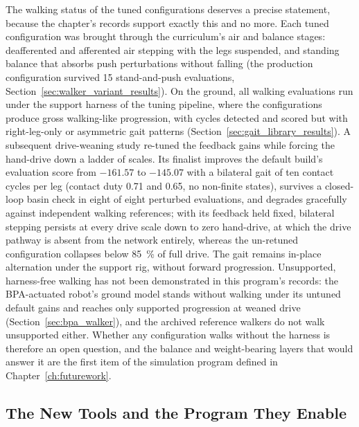 The walking status of the tuned configurations deserves a precise statement, because the chapter's records support exactly this and no more. Each tuned configuration was brought through the curriculum's air and balance stages: deafferented and afferented air stepping with the legs suspended, and standing balance that absorbs push perturbations without falling (the production configuration survived 15 stand-and-push evaluations, Section~\ref{sec:walker_variant_results}). On the ground, all walking evaluations run under the support harness of the tuning pipeline, where the configurations produce gross walking-like progression, with cycles detected and scored but with right-leg-only or asymmetric gait patterns (Section~\ref{sec:gait_library_results}). A subsequent drive-weaning study re-tuned the feedback gains while forcing the hand-drive down a ladder of scales. Its finalist improves the default build's evaluation score from $-161.57$ to $-145.07$ with a bilateral gait of ten contact cycles per leg (contact duty 0.71 and 0.65, no non-finite states), survives a closed-loop basin check in eight of eight perturbed evaluations, and degrades gracefully against independent walking references; with its feedback held fixed, bilateral stepping persists at every drive scale down to zero hand-drive, at which the drive pathway is absent from the network entirely, whereas the un-retuned configuration collapses below \qty{85}{\percent} of full drive. The gait remains in-place alternation under the support rig, without forward progression. Unsupported, harness-free walking has not been demonstrated in this program's records: the BPA-actuated robot's ground model stands without walking under its untuned default gains and reaches only supported progression at weaned drive (Section~\ref{sec:bpa_walker}), and the archived reference walkers do not walk unsupported either. Whether any configuration walks without the harness is therefore an open question, and the balance and weight-bearing layers that would answer it are the first item of the simulation program defined in Chapter~\ref{ch:futurework}.

\subsection{The New Tools and the Program They Enable}\label{sec:sns_tools_summary}

